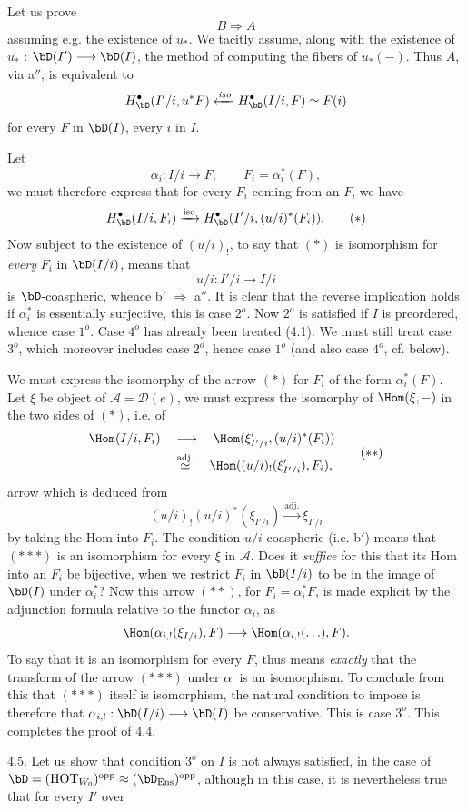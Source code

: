 Let us prove
\[
B \Longrightarrow A
\]
assuming e.g. the existence of $u_*$. We tacitly assume, along with the existence of $u_*$ : $\bD(I') \longrightarrow \bD(I)$, the method of computing the fibers of $u_*(-)$. Thus $A$, via a$''$, is equivalent to
\[
H^{\bullet}_{\bD}(I'/i, u^*F) \xleftarrow{\mathit{iso}} H^{\bullet}_{\bD}(I/i, F) \simeq F(i)
\]
for every $F$ in $\bD(I)$, every $i$ in $I$.

Let
\[
\alpha_i : I/i \longrightarrow F, \qquad F_i = \alpha_i^*(F), %
\]
we must therefore express that for every $F_i$ coming from an $F$, we have
\[
H^{\bullet}_{\bD}(I/i, F_i) \xrightarrow{\mathrm{iso}} H^{\bullet}_{\bD}(I'/i, (u/i)^*(F_i)). \tag*{$(\ast)$}
\]
Now subject to the existence of $(u/i)_!$, to say that $(\ast)$ is isomorphism for \textit{every} $F_i$ in $\bD(I/i)$, means that
\[
u/i : I'/i \longrightarrow I/i
\]
is $\bD$-coaspheric, whence b$'$ $\Longrightarrow$ a$''$. It is clear that the reverse implication holds if $\alpha_i^*$ is essentially surjective, this is case $2^o$. Now $2^o$ is satisfied if $I$ is preordered, whence case $1^o$. Case $4^o$ has already been treated (4.1). We must still treat case $3^o$, which moreover includes case $2^o$, hence case $1^o$ (and also case $4^o$, cf. below).

We must express the isomorphy of the arrow $(\ast)$ for $F_i$ of the form $\alpha_i^*(F)$. Let $\xi$ be object of $\mathcal{A} = \mathcal{D}(e)$, we must express the isomorphy of $\Hom(\xi, -)$ in the two sides of $(\ast)$, i.e. of
\[
\begin{aligned}
\Hom(I/i, F_i) \quad &\longrightarrow \quad \Hom(\xi'_{I'/i}, (u/i)^*(F_i)) \\
&\overset{\text{adj.}}{\simeq} \quad \Hom((u/i)_!(\xi'_{I'/i}), F_i),
\end{aligned}
\tag*{$(\ast\ast)$}
\]
 arrow which is deduced from
\[
(u/i)_!(u/i)^*(\xi_{I'/i}) \xrightarrow{\text{adj.}} \xi_{I'/i} \tag*{$(\ast\ast\ast)$}
\]
by taking the Hom into $F_i$. The condition $u/i$ coaspheric (i.e. b$'$) means that $(\ast\ast\ast)$ is an isomorphism for every $\xi$ in $\mathcal{A}$. Does it \textit{suffice} for this that its Hom into an $F_i$ be bijective, when we restrict $F_i$ in $\bD(I/i)$ to be in the image of $\bD(I)$ under $\alpha_i^*$? Now this arrow $(\ast\ast)$, for $F_i = \alpha_i^*F$, is made explicit by the adjunction formula relative to the functor $\alpha_i$, as
\[
\Hom(\alpha_{i,!}(\xi_{I/i}), F) \longrightarrow \Hom(\alpha_{i,!}(\ldots), F).
\]
To say that it is an isomorphism for every $F$, thus means \textit{exactly} that the transform of the arrow $(\ast\ast\ast)$ under $\alpha_!$ is an isomorphism. To conclude from this that $(\ast\ast\ast)$ itself is isomorphism, the natural condition to impose is therefore that $\alpha_{i,!} : \bD(I/i) \longrightarrow \bD(I)$ be conservative. This is case $3^o$. This completes the proof of 4.4.

4.5. Let us show that condition $3^o$ on $I$ is not always satisfied, in the case of $\bD = (\mathrm{HOT}_{W_0})^{\mathrm{opp}} \approx (\bD_{\mathrm{Ens}})^{\mathrm{opp}}$, although in this case, it is nevertheless true that for every $I'$ over
